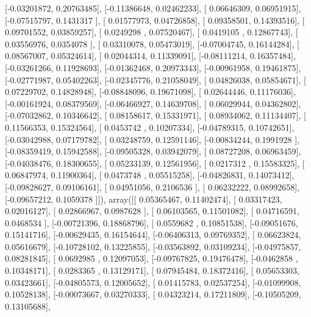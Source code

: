 \documentclass{article}
\begin{document}
       [-0.03201872,  0.20763485],
       [-0.11386648,  0.02462233],
       [ 0.06646309,  0.06951915],
       [-0.07515797,  0.1431317 ],
       [ 0.01577973,  0.04726858],
       [ 0.09358501,  0.14393516],
       [ 0.09701552,  0.03859257],
       [ 0.0249298 ,  0.07520467],
       [ 0.0419105 ,  0.12867743],
       [ 0.03556976,  0.0354078 ],
       [ 0.03310078,  0.05473019],
       [-0.07004745,  0.16144284],
       [ 0.08567007,  0.05324614],
       [ 0.02044314,  0.11339091],
       [-0.08111214,  0.16357484],
       [-0.03261266,  0.11928693],
       [-0.01362468,  0.20973343],
       [-0.00961958,  0.19461875],
       [-0.02771987,  0.05402263],
       [-0.02345776,  0.21058049],
       [ 0.04826038,  0.05854671],
       [ 0.07229702,  0.14828948],
       [-0.08848096,  0.19671098],
       [ 0.02644446,  0.11176036],
       [-0.00161924,  0.08379569],
       [-0.06466927,  0.14639708],
       [ 0.06029944,  0.04362802],
       [-0.07032862,  0.10346642],
       [ 0.08158617,  0.15331971],
       [ 0.08934062,  0.11134407],
       [ 0.11566353,  0.15324564],
       [ 0.0453742 ,  0.10207334],
       [-0.04789315,  0.10742651],
       [-0.03042988,  0.07179782],
       [ 0.03248759,  0.12591146],
       [-0.00834244,  0.1991928 ],
       [-0.08359419,  0.15942588],
       [-0.09505328,  0.03942079],
       [ 0.08727208,  0.06963459],
       [-0.04038476,  0.18300655],
       [ 0.05233139,  0.12561956],
       [ 0.0217312 ,  0.15583325],
       [ 0.06847974,  0.11900364],
       [ 0.0473748 ,  0.05515258],
       [-0.04826831,  0.14073412],
       [-0.09828627,  0.09106161],
       [ 0.04951056,  0.2106536 ],
       [ 0.06232222,  0.08992658],
       [-0.09657212,  0.1059378 ]]), array([[ 0.05365467,  0.11402474],
       [ 0.03317423,  0.02016127],
       [ 0.02866967,  0.0987628 ],
       [ 0.06103565,  0.11501082],
       [ 0.04716591,  0.0468534 ],
       [-0.00721396,  0.18868796],
       [ 0.0559682 ,  0.10851538],
       [-0.09051676,  0.15141716],
       [-0.00629435,  0.16154644],
       [-0.06406313,  0.09769352],
       [ 0.06623824,  0.05616679],
       [-0.10728102,  0.13225855],
       [-0.03563892,  0.03109234],
       [-0.04975857,  0.08281845],
       [ 0.0692985 ,  0.12097053],
       [-0.09767825,  0.19476478],
       [-0.0462858 ,  0.10348171],
       [ 0.0283365 ,  0.13129171],
       [ 0.07945484,  0.18372416],
       [ 0.05653303,  0.03423661],
       [-0.04805573,  0.12005652],
       [ 0.01415783,  0.02537254],
       [-0.01099908,  0.10528138],
       [-0.00073667,  0.03270333],
       [ 0.04323214,  0.17211809],
       [-0.10505209,  0.13105688],
\end{document}

